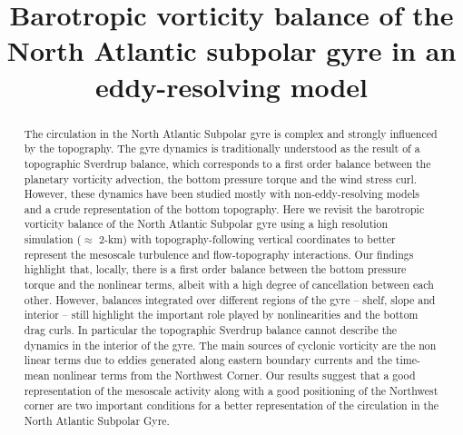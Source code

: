 \documentclass[os, manuscript]{copernicus}
\begin{document}
\title{Barotropic vorticity balance of the North Atlantic subpolar gyre in an eddy-resolving model}











\received{}
\pubdiscuss{} %
\revised{}
\accepted{}
\published{}




\maketitle



\begin{abstract}
The circulation in the North Atlantic Subpolar gyre is complex and strongly influenced by the topography. The gyre dynamics is traditionally understood as the result of a topographic Sverdrup balance, which corresponds to a first order balance between the planetary vorticity advection, the bottom pressure torque and the wind stress curl. However, these dynamics have been studied mostly with non-eddy-resolving models and a crude representation of the bottom topography. Here we revisit the barotropic vorticity balance of the North Atlantic Subpolar gyre using a high resolution simulation ($\approx$ 2-km) with topography-following vertical coordinates to better represent the mesoscale turbulence and flow-topography interactions. Our findings highlight that, locally, there is a first order balance  between the bottom pressure torque and the nonlinear terms, albeit with a high degree of cancellation between each other. However, balances integrated over different regions of the gyre -- shelf, slope and interior -- still highlight the important role played by nonlinearities and the bottom drag curls. In particular the topographic Sverdrup balance cannot describe the dynamics in the interior of the gyre. The main sources of cyclonic vorticity are the non linear terms due to eddies generated along eastern boundary currents and the time-mean nonlinear terms from the Northwest Corner. Our results suggest that a good representation of the mesoscale activity along with a good positioning of the Northwest corner are two important conditions for a better representation of the circulation in the North Atlantic Subpolar Gyre.
\end{abstract}
\end{document}
